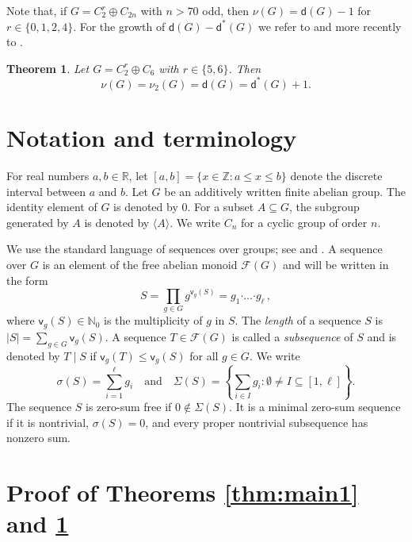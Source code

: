 \documentclass[10pt,a4paper]{amsart}
\newtheorem{theorem}{\bf Theorem}[section]
\newcommand{\dd}{\mathsf d}
\begin{document}
Note that, if $G = C_2^r \oplus C_{2n}$ with $n>70$ odd, then $\nu (G) = \mathsf d (G)-1$ for $r \in \{0,1,2,4\}$. For the growth of $\mathsf d (G) - \mathsf d^* (G)$ we refer to \cite[Theorem 1]{Ma92} and more recently to \cite{Li20a}.



\begin{theorem}\label{thm:main2}
Let $G=C_2^r \oplus C_6$ with $r\in \{5,6\}$. Then $$\nu(G)=\nu_2(G)=\dd(G)=\mathsf d^* (G)+1.$$
\end{theorem}




\section{Notation and terminology}\label{sec:criterion}

For real numbers $a,b\in \mathbb{R}$, let $[a,b]=\{x\in \mathbb{Z}: a\leq x\leq b\}$ denote the discrete interval between $a$ and $b$. Let $G$ be an additively written finite abelian group.
The identity element of $G$ is denoted by $0$. For a subset
$A\subseteq G$, the subgroup generated by $A$ is denoted by
$\langle A\rangle$. We write $C_n$ for a cyclic group of order $n$.


We use the standard language of sequences over groups;  see \cite{Ga-Ge06b}
 and \cite[Chapter 5]{Ge-HK06a}.  A sequence over
$G$ is an element of the free abelian monoid $\mathcal F(G)$ and will be written in the form
\[
S= \prod\limits_{g\in G} g^{\mathsf v_g(S)} = g_1\boldsymbol{\cdot}\ldots\boldsymbol{\cdot}g_\ell \,,
\]
where $\mathsf v_g(S)\in\mathbb N_0$ is the multiplicity of $g$ in $S$.
The {\sl length} of a sequence $S$ is
$|S|=\sum_{g\in G}\mathsf v_g(S)$.  A sequence $T \in \mathcal F(G)$ is called a {\it subsequence } of $S$ and is denoted by $T \mid S$ if  $\mathsf v_g(T) \le \mathsf v_g(S)$ for all $g\in G$.
We write
$$\sigma(S)=\sum_{i=1}^{\ell}g_i
 \quad\text{and}\quad
 \Sigma(S)=\left\{\sum_{i\in I}g_i:
                    \emptyset\ne I\subseteq[1,\ell]\right\}.$$
The sequence $S$ is zero-sum free if $0\notin\Sigma(S)$.
It is a minimal zero-sum sequence if it is nontrivial,
$\sigma(S)=0$, and every proper nontrivial subsequence
has nonzero sum.

\section{Proof of Theorems \ref{thm:main1} and \ref{thm:main2}}\label{sec:constructions}
\end{document}
